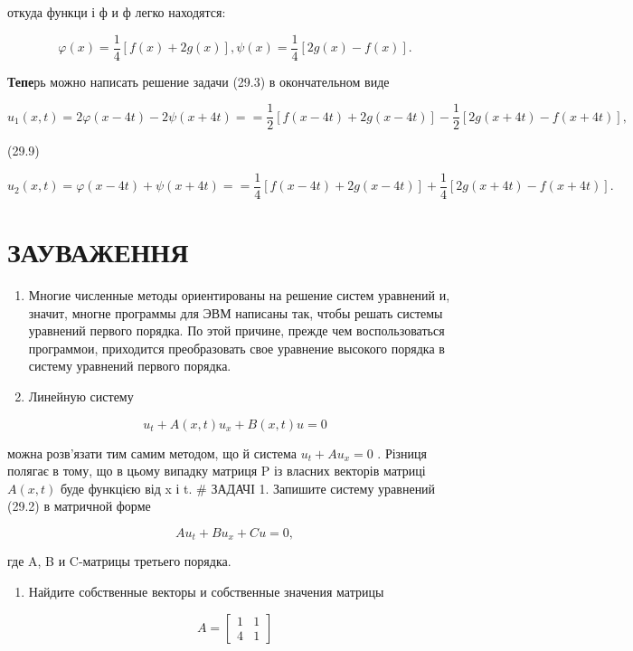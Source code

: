 \documentclass[
  ukrainian,
]{article}
\providecommand{\tightlist}{%
  \setlength{\itemsep}{0pt}\setlength{\parskip}{0pt}}
\begin{document}
откуда функци і ф и ф легко находятся:

\[
\varphi(x) = \frac{1}{4} \left[ f(x) + 2g(x) \right],
\psi(x) = \frac{1}{4} \left[ 2g(x) - f(x) \right].
\]

\textbf{Тепе}рь можно написать решение задачи (29.3) в окончательном
виде

\[
u_{1}(x, t) = 2\varphi(x-4t) - 2\psi(x+4t) =
= \frac{1}{2} \left[ f(x-4t) + 2g(x-4t) \right] - \frac{1}{2} \left[ 2g(x+4t) - f(x+4t) \right],
\]

(29.9)

\[
u_{2}(x, t) = \varphi(x-4t) + \psi(x+4t) =
= \frac{1}{4} \left[ f(x-4t) + 2g(x-4t) \right] + \frac{1}{4} \left[ 2g(x+4t) - f(x+4t) \right].
\]

\section{ЗАУВАЖЕННЯ}\label{ux437ux430ux443ux432ux430ux436ux435ux43dux43dux44f-2}

\begin{enumerate}
\def\labelenumi{\arabic{enumi}.}
\item
  Многие численные методы ориентированы на решение систем уравнений и,
  значит, многне программы для ЭВМ написаны так, чтобы решать системы
  уравнений первого порядка. По этой причине, прежде чем воспользоваться
  программои, приходится преобразовать свое уравнение высокого порядка в
  систему уравнений первого порядка.
\item
  Линейную систему
\end{enumerate}

\[
u_t + A(x, t) u_x + B(x, t) u = 0
\]

можна розв'язати тим самим методом, що й система \(u_t + Au_x = 0\) .
Різниця полягає в тому, що в цьому випадку матриця P із власних векторів
матриці \(A(x, t)\) буде функцією від x і t. \# ЗАДАЧІ 1. Запишите
систему уравнений (29.2) в матричной форме

\[
Au_t + Bu_x + Cu = 0,
\]

где A, B и C-матрицы третьего порядка.

\begin{enumerate}
\def\labelenumi{\arabic{enumi}.}
\setcounter{enumi}{1}
\tightlist
\item
  Найдите собственные векторы и собственные значения матрицы
\end{enumerate}

\[
A =
\begin{bmatrix} 1 & 1 \\ 4 & 1 \end{bmatrix}
\]
\end{document}
